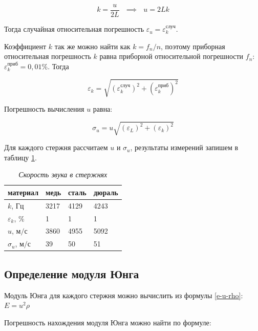 \documentclass[a4paper,12pt]{article}
\begin{document}
\begin{equation}
    k = \frac{u}{2 L} \ \ \ \implies \ \ \ u = 2 L k
\end{equation}

Тогда случайная относительная погрешность $\varepsilon_u = \varepsilon_k^\text{случ}$. 

Коэффициент $k$ так же можно найти как $k = f_n / n$, поэтому приборная относительная погрешность $k$ равна приборной относительной погрешности $f_n$: $\varepsilon_k^\text{приб} = 0,01 \%$. Тогда

\begin{equation}
    \varepsilon_k = \sqrt{\left ( \varepsilon_k^\text{случ}\right )^2 + \left ( \varepsilon_k^\text{приб}\right )^2}
\end{equation}

Погрешность вычисления $u$ равна:

\begin{equation}
    \sigma_u = u \sqrt{\left ( \varepsilon_L \right )^2 + \left ( \varepsilon_k \right )^2}
\end{equation}

Для каждого стержня рассчитаем $u$ и $\sigma_u$, результаты измерений запишем в таблицу \ref{speed-sound}.

\begin{table}[!ht]
    \centering
    \begin{tabular}{|l|l|l|l|}
    \hline
        материал & медь & сталь & дюраль \\ \hline
        $k$, Гц & 3217 & 4129 & 4243 \\ \hline
        $\varepsilon_k$, $\%$ & 1 & 1 & 1 \\ \hline
        $u$, $\text{м}/\text{с}$ & 3860 & 4955 & 5092 \\ \hline
        $\sigma_u$, $\text{м}/\text{с}$ & 39 & 50 & 51 \\ \hline
    \end{tabular}\caption{\textit{Скорость звука в стержнях}}\label{speed-sound}
\end{table}

\subsection{Определение модуля Юнга}

Модуль Юнга для каждого стержня можно вычислить из формулы \eqref{e-u-rho}: $E = u^2 \rho$

Погрешность нахождения модуля Юнга можно найти по формуле:
\end{document}
